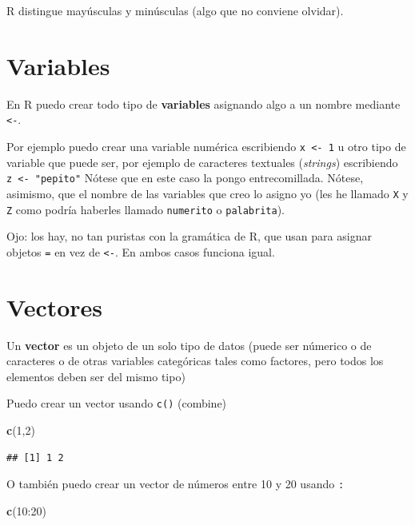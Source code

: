 \documentclass[]{book}
\newenvironment{Shaded}{\begin{snugshade}}{\end{snugshade}}
\newcommand{\KeywordTok}[1]{\textcolor[rgb]{0.13,0.29,0.53}{\textbf{{#1}}}}
\newcommand{\DecValTok}[1]{\textcolor[rgb]{0.00,0.00,0.81}{{#1}}}
\newcommand{\NormalTok}[1]{{#1}}
\theoremstyle{definition}
\theoremstyle{definition}
\theoremstyle{remark}
\begin{document}
R distingue mayúsculas y minúsculas (algo que no conviene olvidar).

\section{Variables}\label{variables}

En R puedo crear todo tipo de \textbf{variables} asignando algo a un
nombre mediante \texttt{\textless{}-}.

Por ejemplo puedo crear una variable numérica escribiendo
\texttt{x\ \textless{}-\ 1} u otro tipo de variable que puede ser, por
ejemplo de caracteres textuales (\emph{strings}) escribiendo
\texttt{z\ \textless{}-\ "pepito"} Nótese que en este caso la pongo
entrecomillada. Nótese, asimismo, que el nombre de las variables que
creo lo asigno yo (les he llamado \texttt{X} y \texttt{Z} como podría
haberles llamado \texttt{numerito} o \texttt{palabrita}).

Ojo: los hay, no tan puristas con la gramática de R, que usan para
asignar objetos \texttt{=} en vez de \texttt{\textless{}-}. En ambos
casos funciona igual.

\section{Vectores}\label{vectores}

Un \textbf{vector} es un objeto de un solo tipo de datos (puede ser
númerico o de caracteres o de otras variables categóricas tales como
factores, pero todos los elementos deben ser del mismo tipo)

Puedo crear un vector usando \texttt{c()} (combine)

\begin{Shaded}
\begin{Highlighting}[]
\KeywordTok{c}\NormalTok{(}\DecValTok{1}\NormalTok{,}\DecValTok{2}\NormalTok{)}
\end{Highlighting}
\end{Shaded}

\begin{verbatim}
## [1] 1 2
\end{verbatim}

O también puedo crear un vector de números entre 10 y 20 usando
\texttt{:}

\begin{Shaded}
\begin{Highlighting}[]
\KeywordTok{c}\NormalTok{(}\DecValTok{10}\NormalTok{:}\DecValTok{20}\NormalTok{)}
\end{Highlighting}
\end{Shaded}
\end{document}
